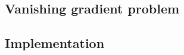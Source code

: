 \documentclass[utf8]{frontiersSCNS}
\newcommand{\mtx}[1]{\bm{#1}}
\begin{document}
\subsection{Vanishing gradient problem}
\label{sec:vangrad}

%

\subsection{Implementation}
\label{sec:implementation}

%
\end{document}
